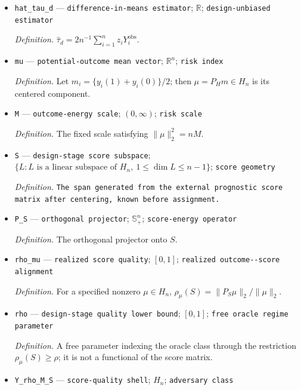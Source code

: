 \documentclass{article}
\begin{document}
\begin{itemize}
  \par\smallskip\noindent\emph{Definition.} \(\tau_n=n^{-1}\sum_{i=1}^n\{y_i(1)-y_i(0)\}\).
  \item \texttt{hat\_\allowbreak{}tau\_\allowbreak{}d} --- \texttt{difference-\allowbreak{}in-\allowbreak{}means estimator}; \(\mathbb R\); \texttt{design-\allowbreak{}unbiased estimator}
  \par\smallskip\noindent\emph{Definition.} \(\widehat\tau_d=2n^{-1}\sum_{i=1}^n z_iY_i^{\mathrm{obs}}\).
  \item \texttt{mu} --- \texttt{potential-\allowbreak{}outcome mean vector}; \(\mathbb R^n\); \texttt{risk index}
  \par\smallskip\noindent\emph{Definition.} Let \(m_i=\{y_i(1)+y_i(0)\}/2\); then \(\mu=P_Hm\in H_n\) is its centered component.
  \item \texttt{M} --- \texttt{outcome-\allowbreak{}energy scale}; \((0,\infty)\); \texttt{risk scale}
  \par\smallskip\noindent\emph{Definition.} The fixed scale satisfying \(\|\mu\|_2^2=nM\).
  \item \texttt{S} --- \texttt{design-\allowbreak{}stage score subspace}; \(\{L:L\text{ is a linear subspace of }H_n,\ 1\leq\dim L\leq n-1\}\); \texttt{score geometry}
  \par\smallskip\noindent\emph{Definition.} \texttt{The span generated from the external prognostic score matrix after centering,\allowbreak{} known before assignment.}
  \item \texttt{P\_\allowbreak{}S} --- \texttt{orthogonal projector}; \(\mathbb S_+^n\); \texttt{score-\allowbreak{}energy operator}
  \par\smallskip\noindent\emph{Definition.} The orthogonal projector onto \(S\).
  \item \texttt{rho\_\allowbreak{}mu} --- \texttt{realized score quality}; \([0,1]\); \texttt{realized outcome-\allowbreak{}-\allowbreak{}score alignment}
  \par\smallskip\noindent\emph{Definition.} For a specified nonzero \(\mu\in H_n\), \(\rho_{\mu}(S)=\|P_S\mu\|_2/\|\mu\|_2\).
  \item \texttt{rho} --- \texttt{design-\allowbreak{}stage quality lower bound}; \([0,1]\); \texttt{free oracle regime parameter}
  \par\smallskip\noindent\emph{Definition.} A free parameter indexing the oracle class through the restriction \(\rho_{\mu}(S)\geq\rho\); it is not a functional of the score matrix.
  \item \texttt{Y\_\allowbreak{}rho\_\allowbreak{}M\_\allowbreak{}S} --- \texttt{score-\allowbreak{}quality shell}; \(H_n\); \texttt{adversary class}

\end{itemize}
\end{document}
